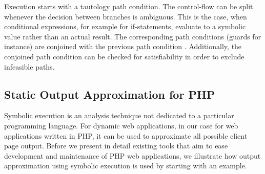 \documentclass[sigconf]{acmart}
\begin{document}
Execution starts with a tautology path
condition. The control-flow can be split whenever the decision between branches
is ambiguous. This is the case, when conditional expressions, for example for
if-statements, evaluate to a symbolic value rather than an actual result.
The corresponding path conditions (guards for instance) are conjoined with the
previous path condition \cite{King1976}. Additionally, the conjoined path
condition can be checked for satisfiability in order to exclude infeasible
paths. 


\subsection{Static Output Approximation for PHP} \label{sec:workflow}
Symbolic execution is an analysis technique not dedicated to a particular
programming language. For dynamic web applications, in our case for web
applications written in PHP, it can be used to approximate all possible client
page output. Before we present in detail existing tools that aim to ease
development and maintenance of PHP web applications, we illustrate how output
approximation using symbolic execution is used by starting with an example.
\end{document}

